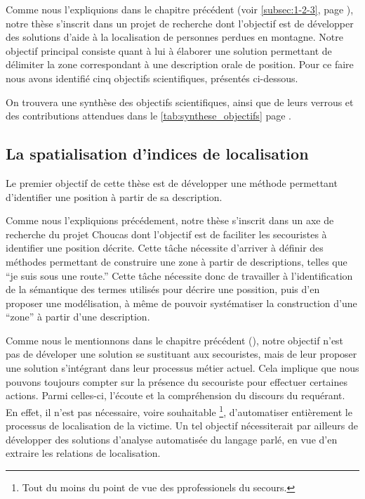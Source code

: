 Comme nous l'expliquions dans le chapitre précédent (voir
\ref{subsec:1-2-3}, page \pageref{subsec:1-2-3}), notre thèse
s'inscrit dans un projet de recherche dont l'objectif est de
développer des solutions d'aide à la localisation de personnes perdues
en montagne. Notre objectif principal consiste quant à lui à élaborer
une solution permettant de délimiter la zone correspondant à une
description orale de position. Pour ce faire nous avons identifié cinq
objectifs scientifiques, présentés ci-dessous.

On trouvera une synthèse des objectifs scientifiques, ainsi que de
leurs verrous et des contributions attendues dans le
\autoref{tab:synthese_objectifs} page
\pageref{tab:synthese_objectifs}.

\subsection{La spatialisation d'indices de localisation}
\label{subsec:2-1-1}

Le premier objectif de cette thèse est de développer une méthode
permettant d'identifier une position à partir de sa
description.

Comme nous l'expliquions précédement, notre thèse s'inscrit dans un
axe de recherche du projet Choucas dont l'objectif est de faciliter
les secouristes à identifier une position décrite.
%
Cette tâche nécessite d'arriver à définir des méthodes permettant de
construire une zone à partir de descriptions, telles que \enquote{je
  suis sous une route.} Cette tâche nécessite donc de travailler à
l'identification de la sémantique des termes utilisés pour décrire une
possition, puis d'en proposer une modélisation, à même de pouvoir
systématiser la construction d'une \enquote{zone} à partir d'une
description.

Comme nous le mentionnons dans le chapitre précédent (), notre
objectif n'est pas de déveloper une solution se sustituant aux
secouristes, mais de leur proposer une solution s'intégrant dans leur
processus métier actuel. Cela implique que nous pouvons toujours
compter sur la présence du secouriste pour effectuer certaines
actions. Parmi celles-ci, l'écoute et la compréhension du discours du
requérant. En effet, il n'est pas nécessaire, voire souhaitable
\footnote{Tout du moins du point de vue des pprofessionels du
  secours.}, d'automatiser entièrement le processus de localisation de
la victime. Un tel objectif nécessiterait par ailleurs de développer
des solutions d'analyse automatisée du langage parlé, en vue d'en
extraire les relations de localisation.

